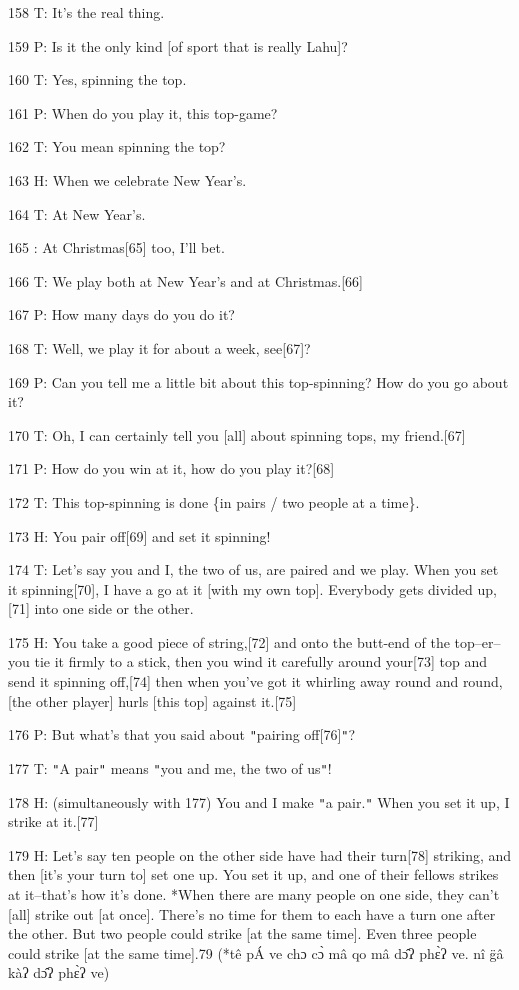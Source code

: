158 T: It's the real thing.

159 P: Is it the only kind [of sport that is really Lahu]?

160 T: Yes, spinning the top.

161 P: When do you play it, this top-game?

162 T: You mean spinning the top?

163 H: When we celebrate New Year's.

164 T: At New Year's.

165    : At Christmas[65] too, I'll bet.

166 T: We play both at New Year's and at Christmas.[66]

167 P: How many days do you do it?

168 T: Well, we play it for about a week, see[67]?

169 P: Can you tell me a little bit about this top-spinning? How do you go about
it?

170 T: Oh, I can certainly tell you [all] about spinning tops, my friend.[67]

171 P: How do you win at it, how do you play it?[68]

172 T: This top-spinning is done \{in pairs / two people at a time\}.

173 H: You pair off[69] and set it spinning!

174 T: Let's say you and I, the two of us, are paired and we play. When you set
it spinning[70], I have a go at it [with my own top]. Everybody gets divided up,[71]
into one side or the other.

175 H: You take a good piece of string,[72] and onto the butt-end of the top--er--you
tie it firmly to a stick, then you wind it carefully around your[73] top and send
it spinning off,[74] then when you've got it whirling away round and round, [the
other player] hurls [this top] against it.[75]

176 P: But what's that you said about \texttt{"}pairing off[76]\texttt{"}?

177 T: \texttt{"}A pair\texttt{"} means \texttt{"}you and me, the two of us\texttt{"}!

178 H: (simultaneously with 177) You and I make \texttt{"}a pair.\texttt{"} When
you set it up, I strike at it.[77]

179 H: Let's say ten people on the other side have had their turn[78] striking,
and then [it's your turn to] set one up. You set it up, and one of their fellows
strikes at it--that's how it's done. *When there are many people on one side, they
can't [all] strike out [at once]. There's no time for them to each have a turn
one after the other. But two people could strike [at the same time]. Even three
people could strike [at the same time].79 (*tê pÁ ve chɔ cɔ̀ mâ qo mâ dɔ̂ʔ
phɛ̀ʔ ve. nî g̈â kàʔ dɔ̂ʔ phɛ̀ʔ ve)

